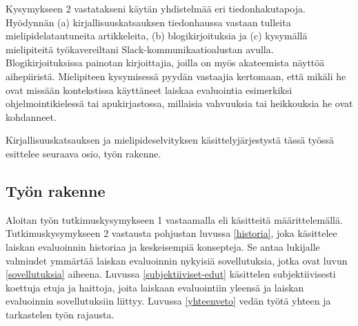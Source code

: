 \begin{sloppypar}
Kysymykseen 2 vastatakseni käytän yhdistelmää eri tiedonhakutapoja. Hyödynnän (a) kirjallisuuskatsauksen tiedonhaussa vastaan tulleita mielipidelatautuneita artikkeleita, (b) blogikirjoituksia ja (c) kysymällä mielipiteitä työkavereiltani Slack-kommunikaatioalustan avulla. Blogikirjoituksissa painotan kirjoittajia, joilla on myös akateemista näyttöä aihepiiristä. Mielipiteen kysymisessä pyydän vastaajia kertomaan, että mikäli he ovat missään kontekstissa käyttäneet laiskaa evaluointia esimerkiksi ohjelmointikielessä tai apukirjastossa, millaisia vahvuuksia tai heikkouksia he ovat kohdanneet.
\end{sloppypar}

Kirjallisuuskatsauksen ja mielipideselvityksen käsittelyjärjestystä tässä työssä esittelee seuraava osio, työn rakenne.

\subsection{Työn rakenne}

Aloitan työn tutkimuskysymykseen 1 vastaamalla eli käsitteitä määrittelemällä. Tutkimuskysymykseen 2 vastausta pohjustan luvussa \ref{historia}, joka käsittelee laiskan evaluoinnin historiaa ja keskeisempiä konsepteja. Se antaa lukijalle valmiudet ymmärtää laiskan evaluoinnin nykyisiä sovellutuksia, jotka ovat luvun \ref{sovellutuksia} aiheena. Luvussa \ref{subjektiiviset-edut} käsittelen subjektiivisesti koettuja etuja ja haittoja, joita laiskaan evaluointiin yleensä ja laiskan evaluoinnin sovellutuksiin liittyy. Luvussa \ref{yhteenveto} vedän työtä yhteen ja tarkastelen työn rajausta.
